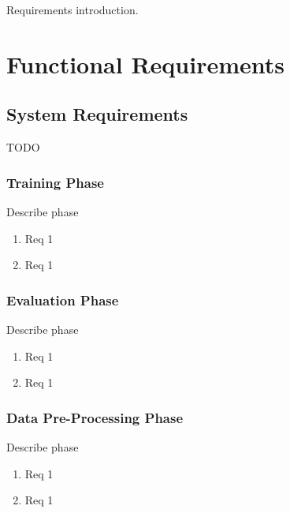 Requirements introduction.


\section{Functional Requirements}


\subsection{System Requirements}

TODO

\subsubsection{Training Phase}

Describe phase

\begin{enumerate}[label=F\arabic*]

    \item Req 1
    
    \item Req 1
        
\end{enumerate}


\subsubsection{Evaluation Phase}

Describe phase

\begin{enumerate}[label=F\arabic*]

    \item Req 1
    
    \item Req 1
        
\end{enumerate}


\subsubsection{Data Pre-Processing Phase}

Describe phase

\begin{enumerate}[label=F\arabic*]

    \item Req 1
    
    \item Req 1
        
\end{enumerate}

